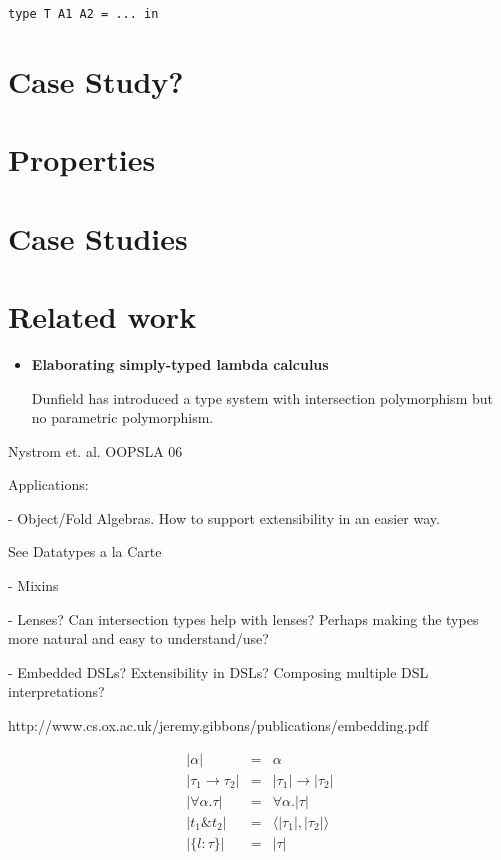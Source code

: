 \documentclass[preprint]{sigplanconf}
\begin{document}
\begin{lstlisting}
type T A1 A2 = ... in
\end{lstlisting}

\section{Case Study?}

\section{Properties}

\section{Case Studies}

\section{Related work}

\begin{itemize}

\item{\bf Elaborating simply-typed lambda calculus}

  Dunfield has introduced a type system with intersection polymorphism but no
  parametric polymorphism.

\end{itemize}

Nystrom et. al. OOPSLA 06


Applications:

- Object/Fold Algebras. How to support extensibility in an easier way.

See Datatypes a la Carte

- Mixins

- Lenses? Can intersection types help with lenses? Perhaps making the
types more natural and easy to understand/use?

- Embedded DSLs? Extensibility in DSLs? Composing multiple DSL interpretations?

http://www.cs.ox.ac.uk/jeremy.gibbons/publications/embedding.pdf


\[
\begin{array}{rcl}
  |\alpha|               & = & \alpha \\
  |\tau_1 \to \tau_2|    & = & |\tau_1| \to |\tau_2| \\
  |\forall \alpha. \tau| & = & \forall \alpha. |\tau| \\
  |t_1 \& t_2|           & = & \langle |\tau_1|, |\tau_2| \rangle \\
  |\{ l : \tau \}|       & = & |\tau|
\end{array}
\]
\end{document}
